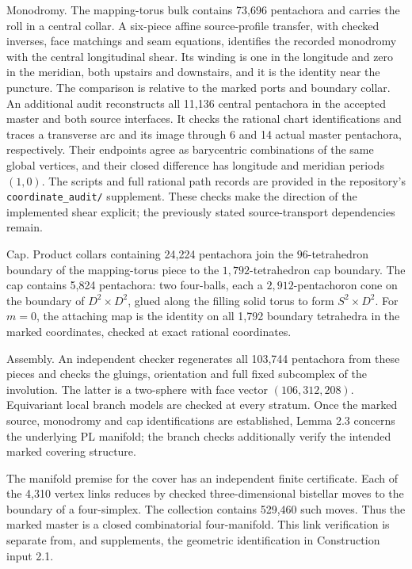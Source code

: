 \documentclass[11pt,letterpaper]{article}
\begin{document}
Monodromy. The mapping-torus bulk contains 73,696 pentachora and carries the roll in a central collar. A six-piece affine source-profile transfer, with checked inverses, face matchings and seam equations, identifies the recorded monodromy with the central longitudinal shear. Its winding is one in the longitude and zero in the meridian, both upstairs and downstairs, and it is the identity near the puncture. The comparison is relative to the marked ports and boundary collar. An additional audit reconstructs all 11,136 central pentachora in the accepted master and both source interfaces. It checks the rational chart identifications and traces a transverse arc and its image through 6 and 14 actual master pentachora, respectively. Their endpoints agree as barycentric combinations of the same global vertices, and their closed difference has longitude and meridian periods $(1,0)$. The scripts and full rational path records are provided in the repository's \texttt{coordinate\_audit/} supplement. These checks make the direction of the implemented shear explicit; the previously stated source-transport dependencies remain.

Cap. Product collars containing 24,224 pentachora join the $96$-tetrahedron boundary of the mapping-torus piece to the $1,792$-tetrahedron cap boundary. The cap contains 5,824 pentachora: two four-balls, each a $2,912$-pentachoron cone on the boundary of $D^2\times D^2$, glued along the filling solid torus to form $S^2\times D^2$. For $m=0$, the attaching map is the identity on all 1,792 boundary tetrahedra in the marked coordinates, checked at exact rational coordinates.

Assembly. An independent checker regenerates all 103,744 pentachora from these pieces and checks the gluings, orientation and full fixed subcomplex of the involution. The latter is a two-sphere with face vector $(106,312,208)$. Equivariant local branch models are checked at every stratum. Once the marked source, monodromy and cap identifications are established, Lemma 2.3 concerns the underlying PL manifold; the branch checks additionally verify the intended marked covering structure.

The manifold premise for the cover has an independent finite certificate. Each of the 4,310 vertex links reduces by checked three-dimensional bistellar moves to the boundary of a four-simplex. The collection contains 529,460 such moves. Thus the marked master is a closed combinatorial four-manifold. This link verification is separate from, and supplements, the geometric identification in Construction input 2.1.
\end{document}
